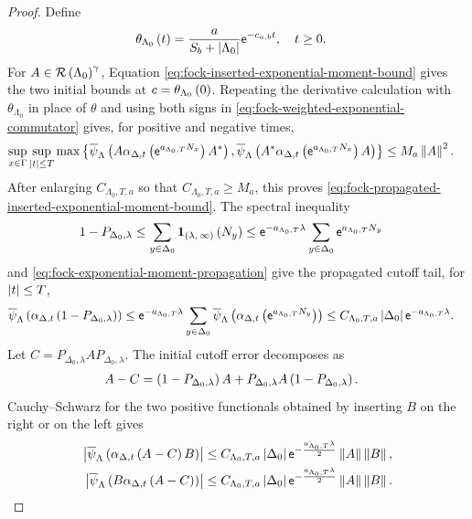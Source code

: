 \documentclass[11pt,a4paper]{article}
\theoremstyle{plain}
\theoremstyle{definition}
\theoremstyle{remark}
\begin{document}
\begin{proof}
Define
$$\begin{aligned}
\theta_{\Lambda_0} \left( t \right)
& =
\frac{a}{S_b+\left| \Lambda_0 \right|}\mathsf{e}^{-c_{a,b}t},
\quad
t\geq0.
\end{aligned}$$
For $A\in\mathcal{R} \left( \Lambda_0 \right)^{\gamma}$,
Equation \eqref{eq:fock-inserted-exponential-moment-bound} gives the two initial bounds at
$c=\theta_{\Lambda_0} \left( 0 \right)$.
Repeating the derivative calculation with $\theta_{\Lambda_0}$ in place of $\theta$ and using
both signs in \eqref{eq:fock-weighted-exponential-commutator} gives, for positive and negative times,
$$\begin{aligned}
\sup_{x\in\Gamma}
\sup_{\abs{t}\leq T}
\max\setone{
\fun{\oastate[\overline{\psi}_{\Lambda}]}{
A\fun{\alpha_{\Delta,t}}{\napiernum^{a_{\Lambda_0,T}N_x}}\faadj{A}},
\fun{\oastate[\overline{\psi}_{\Lambda}]}{
\faadj{A}\fun{\alpha_{\Delta,t}}{\napiernum^{a_{\Lambda_0,T}N_x}}A}}
& \leq
M_a\norm{A}^{2}.
\end{aligned}$$
After enlarging $C_{\Lambda_0,T,a}$ so that $C_{\Lambda_0,T,a}\geq M_a$,
this proves \eqref{eq:fock-propagated-inserted-exponential-moment-bound}.
The spectral inequality
$$\begin{aligned}
1-P_{\Delta_0,\lambda}
& \leq
\sum_{y \in \Delta_0}\boldsymbol{1}_{\left( \lambda,\,\infty \right)} \left( N_y \right)
\leq
\mathsf{e}^{-a_{\Lambda_0,T}\lambda}
\sum_{y \in \Delta_0}\mathsf{e}^{a_{\Lambda_0,T}N_y}
\end{aligned}$$
and \eqref{eq:fock-exponential-moment-propagation} give the propagated cutoff tail,
for $\left| t \right|\leq T$,
$$\begin{aligned}
&
\fun{\oastate[\overline{\psi}_{\Lambda}]}{
\fun{\alpha_{\Delta,t}}{1-P_{\Delta_0,\lambda}}}
\leq
\napiernum^{-a_{\Lambda_0,T}\lambda}
\sum_{y\in \Delta_0}
\fun{\oastate[\overline{\psi}_{\Lambda}]}{
\fun{\alpha_{\Delta,t}}{\napiernum^{a_{\Lambda_0,T}N_y}}}
\leq
C_{\Lambda_0,T,a}\abscard{\Delta_0}
\napiernum^{-a_{\Lambda_0,T}\lambda}.
\end{aligned}$$
Let $C=P_{\Delta_0,\lambda}AP_{\Delta_0,\lambda}$.
The initial cutoff error decomposes as
$$\begin{aligned}
A-C
& =
\left( 1-P_{\Delta_0,\lambda} \right)A
+
P_{\Delta_0,\lambda}A\left( 1-P_{\Delta_0,\lambda} \right).
\end{aligned}$$
Cauchy--Schwarz for the two positive functionals obtained by inserting $B$ on the right or on the left gives
\begin{equation}
\begin{aligned}
\abs{
\fun{\oastate[\overline{\psi}_{\Lambda}]}{
\fun{\alpha_{\Delta,t}}{
A-C}B}}
& \leq
C_{\Lambda_0,T,a}
\abscard{\Delta_0}
\napiernum^{-\frac{a_{\Lambda_0,T}\lambda}{2}}
\norm{A}\norm{B},
\\
\abs{
\fun{\oastate[\overline{\psi}_{\Lambda}]}{
B\fun{\alpha_{\Delta,t}}{
A-C}}}
& \leq
C_{\Lambda_0,T,a}
\abscard{\Delta_0}
\napiernum^{-\frac{a_{\Lambda_0,T}\lambda}{2}}
\norm{A}\norm{B}.
\end{aligned}
\label{eq:fock-initial-cutoff-error-bound}
\end{equation}


\end{proof}
\end{document}
